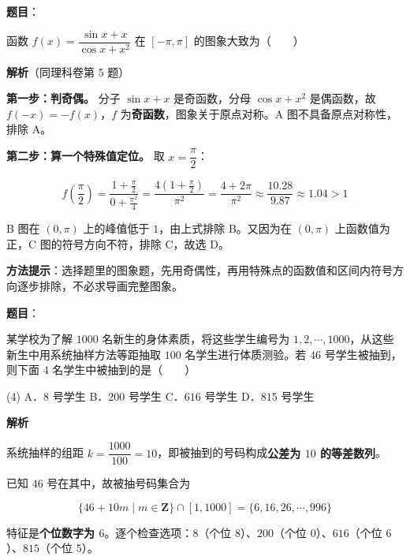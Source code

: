 \begin{answer}

\textbf{题目}：

函数 $f(x)=\dfrac{\sin x+x}{\cos x+x^{2}}$ 在 $[-\pi,\pi]$ 的图象大致为\mbox{（　　）}
\nopagebreak[4]
\begin{center}\end{center}
\nopagebreak[4]
\textbf{解析}（同理科卷第 5 题）

\textbf{第一步：判奇偶。} 分子 $\sin x+x$ 是奇函数，分母 $\cos x+x^{2}$ 是偶函数，故 $f(-x)=-f(x)$，$f$ 为\textbf{奇函数}，图象关于原点对称。A 图不具备原点对称性，排除 A。

\textbf{第二步：算一个特殊值定位。} 取 $x=\dfrac\pi2$：

\nopagebreak[4]
\[f\!\left(\frac\pi2\right)=\frac{1+\frac\pi2}{0+\frac{\pi^{2}}4}=\frac{4\left(1+\frac\pi2\right)}{\pi^{2}}=\frac{4+2\pi}{\pi^{2}}\approx\frac{10.28}{9.87}\approx1.04>1\]

B 图在 $\left(0,\pi\right)$ 上的峰值低于 $1$，由上式排除 B。又因为在 $\left(0,\pi\right)$ 上函数值为正，C 图的符号方向不符，排除 C，故选 D。

\begin{gktip}
\textbf{方法提示}：选择题里的图象题，先用奇偶性，再用特殊点的函数值和区间内符号方向逐步排除，不必求导画完整图象。
\end{gktip}


\par\medskip

\end{answer}
\begin{answer}

\textbf{题目}：

某学校为了解 $1000$ 名新生的身体素质，将这些学生编号为 $1,2,\cdots,1000$，从这些新生中用系统抽样方法等距抽取 $100$ 名学生进行体质测验。若 $46$ 号学生被抽到，则下面 $4$ 名学生中被抽到的是\mbox{（　　）}

\begin{gkopts}(4)
\task A．$8$ 号学生
\task B．$200$ 号学生
\task C．$616$ 号学生
\task D．$815$ 号学生
\end{gkopts}

\textbf{解析}

系统抽样的组距 $k=\dfrac{1000}{100}=10$，即被抽到的号码构成\textbf{公差为 $10$ 的等差数列}。

已知 $46$ 号在其中，故被抽号码集合为

\nopagebreak[4]
\[\{46+10m\mid m\in\mathbf Z\}\cap[1,1000]=\{6,16,26,\cdots,996\}\]

特征是\textbf{个位数字为 $6$}。逐个检查选项：$8$（个位 $8$）、$200$（个位 $0$）、$616$（个位 $6$ ）、$815$（个位 $5$）。


\par\medskip

\end{answer}
